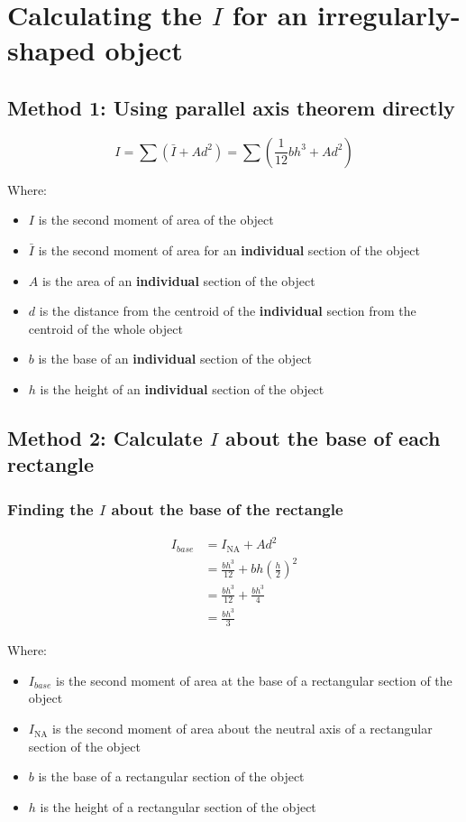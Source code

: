 \documentclass[11pt]{article}
\begin{document}
\section{Calculating the \(I\) for an irregularly-shaped object}
\label{sec:orgcc295c6}

\subsection{Method 1: Using parallel axis theorem directly}
\label{sec:org8ee7374}
\[I = \sum \left(\bar{I} + Ad^2 \right) = \sum \left(\frac{1}{12} bh^3 + Ad^2 \right)\]

Where:
\begin{itemize}
\item \(I\) is the second moment of area of the object
\item \(\bar{I}\) is the second moment of area for an \textbf{individual} section of the object
\item \(A\) is the area of an \textbf{individual} section of the object
\item \(d\) is the distance from the centroid of the \textbf{individual} section from the centroid of the whole object
\item \(b\) is the base of an \textbf{individual} section of the object
\item \(h\) is the height of an \textbf{individual} section of the object
\end{itemize}

\newpage

\subsection{Method 2: Calculate \(I\) about the base of each rectangle}
\label{sec:org0e31e23}

\subsubsection{Finding the \(I\) about the base of the rectangle}
\label{sec:org8de8d08}
\begin{align*}
I_{base} &= I_{\text{NA}} + Ad^2 \\
&= \frac{bh^3}{12} + bh \left( \frac{h}{2} \right)^2 \\
&= \frac{bh^3}{12} + \frac{bh^3}{4} \\
&= \frac{bh^3}{3}
\end{align*}

Where:
\begin{itemize}
\item \(I_{base}\) is the second moment of area at the base of a rectangular section of the object
\item \(I_{\text{NA}}\) is the second moment of area about the neutral axis of a rectangular section of the object
\item \(b\) is the base of a rectangular section of the object
\item \(h\) is the height of a rectangular section of the object
\end{itemize}
\end{document}
